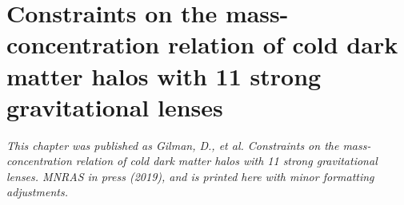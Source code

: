 \documentclass [PhD] {uclathes}
\begin{document}
\chapter{Constraints on the mass-concentration relation of cold dark matter halos with 11 strong gravitational lenses}
\textit{This chapter was published as Gilman, D., et al. Constraints on the mass-concentration relation of cold dark matter halos with 11 strong gravitational lenses. MNRAS in press (2019), and is printed here with minor formatting adjustments.}

\end{document}

